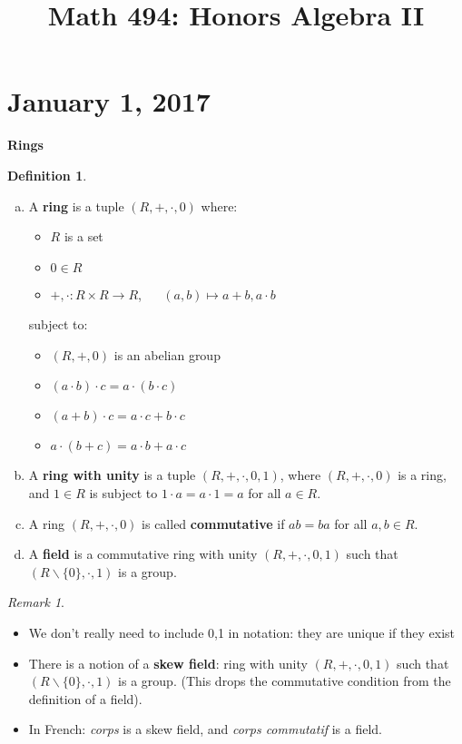 \documentclass{amsart}
\theoremstyle{definition}
\newtheorem{defn}[thm]{Definition}
\theoremstyle{remark}
\newtheorem*{rmk}{Remark}
\begin{document}
\title{Math 494: Honors Algebra II}
\maketitle
\section{January 1, 2017}
\noindent \textbf{Rings}
\begin{defn} \hspace{0.5cm}
    \begin{enumerate}[a)]
    \item A \textbf{ring} is a tuple $(R, +, \cdot, 0)$ where:
    \begin{itemize}
        \item $R$ is a set
        \item $0 \in R$
        \item $+,\cdot: R \times R \rightarrow R$, $\quad$  $(a,b) \mapsto a + b, a \cdot b$
    \end{itemize}
    subject to:
    \begin{itemize}
        \item $(R, +, 0)$ is an abelian group
        \item $(a \cdot b) \cdot c = a \cdot (b \cdot c)$
        \item $(a + b) \cdot c = a \cdot c + b \cdot c$
        \item $a \cdot (b + c) = a \cdot b + a \cdot c$
    \end{itemize}
    \item A \textbf{ring with unity} is a tuple $(R, +, \cdot, 0, 1)$, where
    $(R,+,\cdot,0)$ is a ring, and $1 \in R$ is subject to $1 \cdot a = a \cdot 1 = a$
    for all $a \in R$.
    \item A ring $(R, +, \cdot, 0)$ is called \textbf{commutative} if $ab = ba$ for all
    $a, b \in R$.
    \item A \textbf{field} is a commutative ring with unity $(R,+,\cdot,0,1)$ such
    that $(R \backslash \{0\}, \cdot, 1)$ is a group.
    \end{enumerate}
\end{defn}
\begin{rmk} \hspace{0.5cm}
    \begin{itemize}
        \item We don't really need to include 0,1 in notation: they are unique
        if they exist
        \item There is a notion of a \textbf{skew field}: ring with unity
        $(R,+,\cdot,0,1)$ such that $(R \backslash \{0\}, \cdot , 1)$ is a group.
        (This drops the commutative condition from the definition of a field).
        \item In French: \textit{corps} is a skew field, and \textit{corps commutatif} is a field.
    \end{itemize}
\end{rmk}
\end{document}
